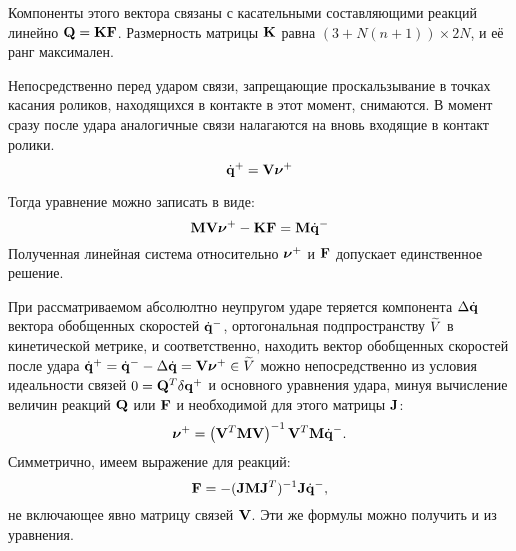 Компоненты этого вектора связаны с касательными составляющими реакций линейно $\mathbf{Q} = \mathbf{K} \mathbf{F}$.
%
Размерность матрицы $\mathbf{K}$ равна $(3 + N(n+1)) \times 2N$, и её ранг максимален.

Непосредственно перед ударом связи, запрещающие проскальзывание в точках касания роликов, находящихся в контакте в этот момент, снимаются.
В момент сразу после удара аналогичные связи налагаются на вновь входящие в контакт ролики.
\begin{equation*}
\dot{\mathbf{q}}^+ = \mathbf{V}\boldsymbol{\mathbf{\nu}}^+
\end{equation*}

Тогда уравнение можно записать в виде:
\begin{equation}\label{eq:udar_mat}
\mathbf{M}\mathbf{V}\boldsymbol{\mathbf{\nu}}^+ - \mathbf{K}\mathbf{F} = \mathbf{M}\dot{\mathbf{q}}^-
\end{equation}
Полученная линейная система относительно $\boldsymbol{\mathbf{\nu}}^+$ и $\mathbf{F}$ допускает единственное решение.

При рассматриваемом абсолюлтно неупругом ударе теряется компонента $\Delta\dot{\mathbf{q}}$ вектора обобщенных скоростей $\dot{\mathbf{q}}^-$, ортогональная подпространству $\widetilde{V}$ в кинетической метрике, и соответственно, находить вектор обобщенных скоростей после удара $\dot{\mathbf{q}}^+ = \dot{\mathbf{q}}^- - \Delta\dot{\mathbf{q}} = \mathbf{V}\boldsymbol{\mathbf{\nu}}^+ \in \widetilde{V}$ можно непосредственно из условия идеальности связей $0 = \mathbf{Q}^T \delta\mathbf{q}^+$ и основного уравнения удара, минуя вычисление величин реакций $\mathbf{Q}$ или $\mathbf{F}$ и необходимой для этого матрицы $\mathbf{J}$:
\begin{equation*}
\boldsymbol{\mathbf{\nu}}^+ = \left( \mathbf{V}^T\mathbf{M}\mathbf{V} \right)^{-1}\mathbf{V}^T\mathbf{M}\dot{\mathbf{q}}^-.
\end{equation*}
Симметрично, имеем выражение для реакций:
\begin{equation*}
    \mathbf{F} = -(\mathbf{J} \mathbf{M} \mathbf{J}^T)^{-1}\mathbf{J}\dot{\mathbf{q}}^-,
\end{equation*}
не включающее явно матрицу связей $\mathbf{V}$. Эти же формулы можно получить и из уравнения.

